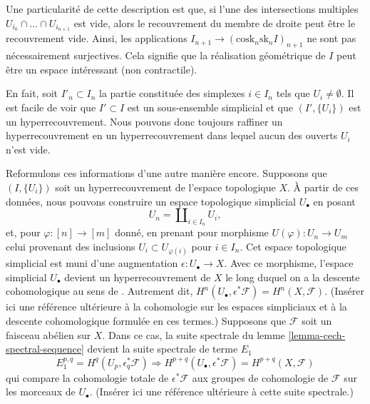 \begin{remark}
\label{remark-not-covering-set}
Une particularité de cette description est que, si l'une des intersections multiples
$U_{i_0} \cap \ldots \cap U_{i_{n + 1}}$ est vide, alors
le recouvrement du membre de droite peut être le recouvrement vide.
Ainsi, les applications
$I_{n + 1} \to (\text{cosk}_n\text{sk}_n I)_{n + 1}$ ne sont pas nécessairement surjectives.
Cela signifie que la réalisation géométrique de $I$ peut être un espace
intéressant (non contractile).

\medskip\noindent
En fait, soit $I'_n \subset I_n$ la partie
constituée des simplexes $i \in I_n$ tels que
$U_i \not = \emptyset$. Il est facile de voir que $I' \subset I$
est un sous-ensemble simplicial et que $(I', \{U_i\})$ est un hyperrecouvrement.
Nous pouvons donc toujours raffiner un hyperrecouvrement en un hyperrecouvrement dans lequel
aucun des ouverts $U_i$ n'est vide.
\end{remark}

\begin{remark}
\label{remark-repackage-into-simplicial-space}
Reformulons ces informations d'une autre manière encore.
Supposons que $(I, \{U_i\})$ soit un hyperrecouvrement de
l'espace topologique $X$. À partir de ces données, nous pouvons construire
un espace topologique simplicial $U_\bullet$ en posant
$$
U_n = \coprod\nolimits_{i \in I_n} U_i,
$$
et, pour $\varphi : [n] \to [m]$ donné, en prenant pour
morphisme $U(\varphi) : U_n \to U_m$ celui
provenant des inclusions $U_i \subset U_{\varphi(i)}$
pour $i \in I_n$. Cet espace topologique simplicial est muni
d'une augmentation $\epsilon : U_\bullet \to X$.
Avec ce morphisme, l'espace simplicial $U_\bullet$ devient
un hyperrecouvrement de $X$ le long duquel on a la descente cohomologique
au sens de \cite[Expos\'e Vbis]{SGA4}.
Autrement dit, $H^n(U_\bullet, \epsilon^*\mathcal{F}) = H^n(X, \mathcal{F})$.
(Insérer ici une référence ultérieure à la cohomologie sur les espaces
simpliciaux et à la descente cohomologique formulée en ces termes.)
Supposons que $\mathcal{F}$ soit un faisceau abélien sur $X$.
Dans ce cas, la suite spectrale du lemme \ref{lemma-cech-spectral-sequence}
devient la suite spectrale de terme $E_1$
$$
E_1^{p, q} = H^q(U_p, \epsilon_q^*\mathcal{F})
\Rightarrow
H^{p + q}(U_\bullet, \epsilon^*\mathcal{F}) = H^{p + q}(X, \mathcal{F})
$$
qui compare la cohomologie totale de $\epsilon^*\mathcal{F}$
aux groupes de cohomologie de $\mathcal{F}$ sur les morceaux
de $U_\bullet$. (Insérer ici une référence ultérieure à cette suite
spectrale.)
\end{remark}

